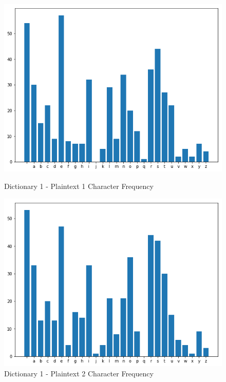 \documentclass[12pt]{article}
\begin{document}
\begin{figure}[H]
    \centering
    \includegraphics[scale=0.5]{pt1.png}
    \caption{Dictionary 1 - Plaintext 1 Character Frequency}
    \label{fig:pt1}

    \centering
    \includegraphics[scale=0.5]{pt2.png}
    \caption{Dictionary 1 - Plaintext 2 Character Frequency}
    \label{fig:pt2}


\end{figure}
\end{document}
